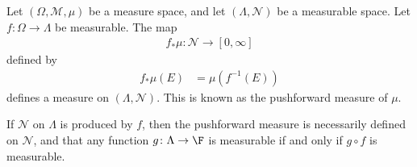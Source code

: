 %
\begin{definition}
  Let $\left(\Omega,\mathcal{M},\mu\right)$ be a measure space, and let $\left(\Lambda,\mathcal{N}\right)$ be a measurable space. Let $f\colon \Omega\rightarrow \Lambda$ be measurable. The map
  \begin{align*}
    f_{\ast}\mu\colon \mathcal{N}\rightarrow [0,\infty]
  \end{align*}
  defined by
  \begin{align*}
    f_{\ast}\mu\left(E\right) &= \mu\left(f^{-1}\left(E\right)\right)
  \end{align*}
  defines a measure on $\left(\Lambda,\mathcal{N}\right)$. This is known as the pushforward measure of $\mu$.\newline

  If $\mathcal{N}$ on $\Lambda$ is produced by $f$, then the pushforward measure is necessarily defined on $\mathcal{N}$, and that any function $g\colon \Lambda\rightarrow \F$ is measurable if and only if $g\circ f$ is measurable.
\end{definition}
